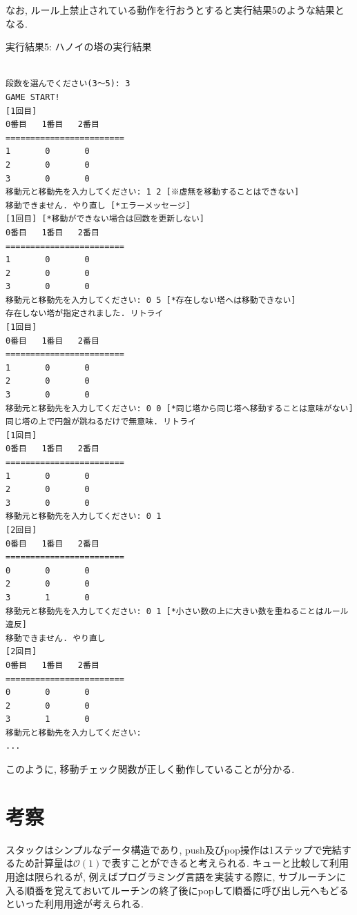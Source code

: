 \documentclass[a4j]{jsarticle}
\begin{document}
        なお, ルール上禁止されている動作を行おうとすると実行結果5のような結果となる. 
        \begin{breakitembox}[l]{実行結果5: ハノイの塔の実行結果}
        \begin{verbatim}

段数を選んでください(3〜5): 3
GAME START!
[1回目]
0番目   1番目   2番目
========================
1       0       0
2       0       0
3       0       0
移動元と移動先を入力してください: 1 2 [※虚無を移動することはできない]
移動できません. やり直し [*エラーメッセージ]
[1回目] [*移動ができない場合は回数を更新しない]
0番目   1番目   2番目
========================
1       0       0
2       0       0
3       0       0
移動元と移動先を入力してください: 0 5 [*存在しない塔へは移動できない]
存在しない塔が指定されました. リトライ
[1回目]
0番目   1番目   2番目
========================
1       0       0
2       0       0
3       0       0
移動元と移動先を入力してください: 0 0 [*同じ塔から同じ塔へ移動することは意味がない]
同じ塔の上で円盤が跳ねるだけで無意味. リトライ
[1回目]
0番目   1番目   2番目
========================
1       0       0
2       0       0
3       0       0
移動元と移動先を入力してください: 0 1
[2回目]
0番目   1番目   2番目
========================
0       0       0
2       0       0
3       1       0
移動元と移動先を入力してください: 0 1 [*小さい数の上に大きい数を重ねることはルール違反]
移動できません. やり直し
[2回目]
0番目   1番目   2番目
========================
0       0       0
2       0       0
3       1       0
移動元と移動先を入力してください:
...
        \end{verbatim}
        \end{breakitembox}
        このように, 移動チェック関数が正しく動作していることが分かる. 
\section{考察}
    スタックはシンプルなデータ構造であり, push及びpop操作は1ステップで完結するため計算量は$\mathcal{O}(1)$で表すことができると考えられる. 
    キューと比較して利用用途は限られるが, 例えばプログラミング言語を実装する際に, 
    サブルーチンに入る順番を覚えておいてルーチンの終了後にpopして順番に呼び出し元へもどるといった利用用途が考えられる. 
\end{document}
